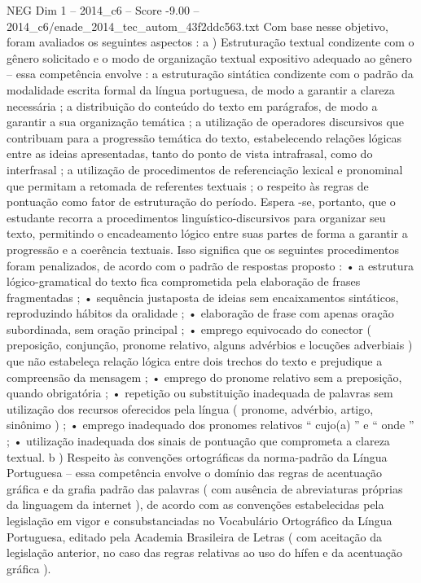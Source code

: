 \begin{textsample}{NEG Dim 1 – 2014\_c6 – Score -9.00 – 2014\_c6/enade\_2014\_tec\_autom\_43f2ddc563.txt}
Com base nesse objetivo, foram avaliados os seguintes aspectos : a ) Estruturação textual condizente com o gênero solicitado e o modo de organização textual expositivo adequado ao gênero – essa competência envolve : a estruturação sintática condizente com o padrão da modalidade escrita formal da língua portuguesa, de modo a garantir a clareza necessária ; a distribuição do conteúdo do texto em parágrafos, de modo a garantir a sua organização temática ; a utilização de operadores discursivos que contribuam para a progressão temática do texto, estabelecendo relações lógicas entre as ideias apresentadas, tanto do ponto de vista intrafrasal, como do interfrasal ; a utilização de procedimentos de referenciação lexical e pronominal que permitam a retomada de referentes textuais ; o respeito às regras de pontuação como fator de estruturação do período.
Espera -se, portanto, que o estudante recorra a procedimentos linguístico-discursivos para organizar seu texto, permitindo o encadeamento lógico entre suas partes de forma a garantir a progressão e a coerência textuais.
Isso significa que os seguintes procedimentos foram penalizados, de acordo com o padrão de respostas proposto : • a estrutura lógico-gramatical do texto fica comprometida pela elaboração de frases fragmentadas ; • sequência justaposta de ideias sem encaixamentos sintáticos, reproduzindo hábitos da oralidade ; • elaboração de frase com apenas oração subordinada, sem oração principal ; • emprego equivocado do conector ( preposição, conjunção, pronome relativo, alguns advérbios e locuções adverbiais ) que não estabeleça relação lógica entre dois trechos do texto e prejudique a compreensão da mensagem ; • emprego do pronome relativo sem a preposição, quando obrigatória ; • repetição ou substituição inadequada de palavras sem utilização dos recursos oferecidos pela língua ( pronome, advérbio, artigo, sinônimo ) ; • emprego inadequado dos pronomes relativos “ cujo(a) ” e “ onde ” ; • utilização inadequada dos sinais de pontuação que comprometa a clareza textual. b ) Respeito às convenções ortográficas da norma-padrão da Língua Portuguesa – essa competência envolve o domínio das regras de acentuação gráfica e da grafia padrão das palavras ( com ausência de abreviaturas próprias da linguagem da internet ), de acordo com as convenções estabelecidas pela legislação em vigor e consubstanciadas no Vocabulário Ortográfico da Língua Portuguesa, editado pela Academia Brasileira de Letras ( com aceitação da legislação anterior, no caso das regras relativas ao uso do hífen e da acentuação gráfica ).

\end{textsample}
